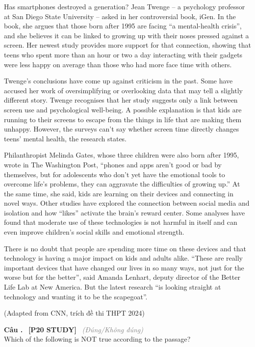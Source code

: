 \documentclass[12pt,a4paper,twoside]{article}
\newcounter{qcounter}
\newcommand{\question}[2][]{%
    \stepcounter{qcounter}%
    \par\vspace{6pt}%
    \noindent\textcolor{primaryBlue}{\textbf{Câu \theqcounter.}}~%
    \textcolor{secondaryBlue}{\small\textbf{[P20 STUDY]}}~%
    \if\relax\detokenize{#1}\relax\else\textcolor{gray}{\small\textit{(#1)}}~\fi\\[1pt]
    \noindent #2%
}
\newenvironment{readingpassage}[1][]{%
    \begin{tcolorbox}[enhanced, colback=grayLight, colframe=secondaryBlue,
        coltitle=textDark, fonttitle=\bfseries, title={#1},
        rounded corners, arc=3mm, boxrule=1pt,
        left=15pt, right=15pt, top=10pt, bottom=10pt,
        breakable, before skip=10pt, after skip=10pt, drop fuzzy shadow]
    \setstretch{1.3}
}{\end{tcolorbox}}
\begin{document}
\begin{readingpassage}[]
Has smartphones destroyed a generation? Jean Twenge – a psychology professor at San Diego State University – asked in her controversial book, iGen. In the book, she argues that those born after 1995 are facing “a mental-health crisis”, and she believes it can be linked to growing up with their noses pressed against a screen. Her newest study provides more support for that connection, showing that teens who spent more than an hour or two a day interacting with their gadgets were less happy on average than those who had more face time with others.

Twenge’s conclusions have come up against criticism in the past. Some have accused her work of oversimplifying or overlooking data that may tell a slightly different story. Twenge recognises that her study suggests only a link between screen use and psychological well-being. A possible explanation is that kids are running to their screens to escape from the things in life that are making them unhappy. However, the surveys can’t say whether screen time directly changes teens’ mental health, the research states.

Philanthropist Melinda Gates, whose three children were also born after 1995, wrote in The Washington Post, “phones and apps aren’t good or bad by themselves, but for adolescents who don’t yet have the emotional tools to overcome life’s problems, they can aggravate the difficulties of growing up.” At the same time, she said, kids are learning on their devices and connecting in novel ways. Other studies have explored the connection between social media and isolation and how “likes” activate the brain’s reward center. Some analyses have found that moderate use of these technologies is not harmful in itself and can even improve children’s social skills and emotional strength.

There is no doubt that people are spending more time on these devices and that technology is having a major impact on kids and adults alike. “These are really important devices that have changed our lives in so many ways, not just for the worse but for the better”, said Amanda Lenhart, deputy director of the Better Life Lab at New America. But the latest research “is looking straight at technology and wanting it to be the scapegoat”.

(Adapted from CNN, trích đề thi THPT 2024)
\end{readingpassage}

\question[Đúng/Không đúng]{Which of the following is NOT true according to the passage?}
\end{document}
